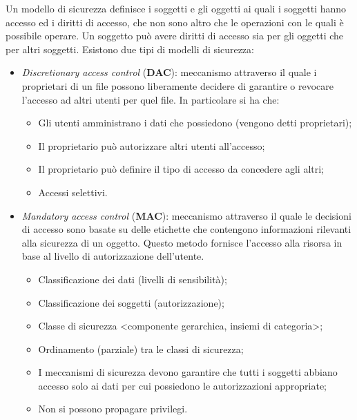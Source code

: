 Un modello di sicurezza definisce i soggetti e gli oggetti ai quali i soggetti
hanno accesso ed i diritti
di accesso, che non sono altro che le operazioni con le quali è possibile
operare. Un soggetto può
avere diritti di accesso sia per gli oggetti che per altri soggetti.
Esistono due tipi di modelli di sicurezza:
\begin{itemize}
    \item \textit{Discretionary access control} (\textbf{DAC}): meccanismo attraverso il quale i proprietari di un file possono liberamente decidere di garantire o revocare l'accesso ad altri utenti per quel file. In particolare si ha che:
          \begin{itemize}
              \item Gli utenti amministrano i dati che possiedono (vengono
                    detti proprietari);
              \item Il proprietario può autorizzare altri utenti all'accesso;
              \item Il proprietario può definire il tipo di accesso da
                    concedere agli altri;
              \item Accessi selettivi.
          \end{itemize}
    \item \textit{Mandatory access control} (\textbf{MAC}): meccanismo
          attraverso il quale le decisioni di accesso
          sono basate su delle etichette che contengono informazioni
          rilevanti alla sicurezza di un
          oggetto. Questo metodo fornisce l'accesso alla risorsa in base al
          livello di autorizzazione dell'utente.
          \begin{itemize}
              \item Classificazione dei dati (livelli di sensibilità);
              \item Classificazione dei soggetti (autorizzazione);
              \item Classe di sicurezza <componente gerarchica, insiemi di
                    categoria>;
              \item Ordinamento (parziale) tra le classi di sicurezza;
              \item I meccanismi di sicurezza devono garantire che tutti i
                    soggetti abbiano accesso solo
                    ai dati per cui possiedono le autorizzazioni appropriate;
              \item Non si possono propagare privilegi.
          \end{itemize}
\end{itemize}

